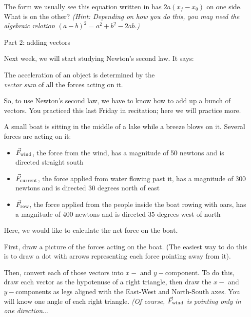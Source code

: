 \documentclass[12pt]{article}
\begin{document}
The form we usually see this equation written in has $2a(x_f - x_0)$ on one side. What is on the other? {\it (Hint: Depending on how you do this, you may need the algebraic relation $(a - b)^2 = a^2 + b^2 - 2ab$.)}

\newpage

\begin{center}
	\Large
	Part 2: adding vectors
\end{center}

Next week, we will start studying Newton's second law. It says:

\begin{center}
	{\large The acceleration of an object is determined by the \\{\it vector sum} of all the forces acting on it.}
\end{center}

So, to use Newton's second law, we have to know how to add up a bunch of vectors. You practiced this last Friday in recitation; here we will practice more.



A small boat is sitting in the middle of a lake while a breeze blows on it. Several forces are acting on it:
	\begin{itemize}
		\item $\vec F_{\rm wind}$, the force from the wind, has a magnitude of 50 newtons and is directed straight south
		\item $\vec F_{\rm current}$, the force applied from water flowing past it, has a magnitude of 300 newtons and is directed 30 degrees north of east
		\item $\vec F_{\rm row}$, the force applied from the people inside the boat rowing with oars, has a magnitude of 400 newtons and is directed 35 degrees west of north
	\end{itemize}

     Here, we would like to calculate the net force on the boat.

     First, draw a picture of the forces acting on the boat. (The easiest way to do this is to draw a dot with arrows representing each force pointing away from it).
     
     \vspace{3in}
     \newpage
     Then, convert each of those vectors into $x-$ and $y-$component. To do this, draw each vector as the hypotenuse of a right triangle, then draw the $x-$ and $y-$components as legs aligned with the East-West and North-South axes. You will know one angle of each right triangle. {\it (Of course, $\vec F_{\rm wind}$ is pointing only in one direction...}
\end{document}
